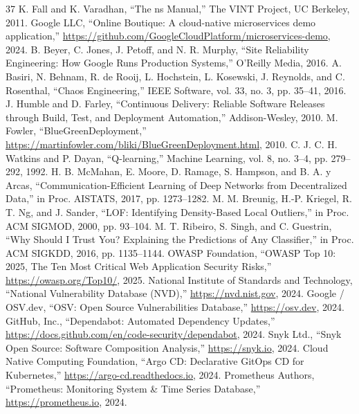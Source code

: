 \documentclass[10pt,conference]{IEEEtran}
\begin{document}
\begin{thebibliography}{37}
 K. Fall and K. Varadhan, ``The ns Manual,'' The VINT Project, UC Berkeley, 2011.
 Google LLC, ``Online Boutique: A cloud-native microservices demo application,'' \url{https://github.com/GoogleCloudPlatform/microservices-demo}, 2024.
 B. Beyer, C. Jones, J. Petoff, and N. R. Murphy, ``Site Reliability Engineering: How Google Runs Production Systems,'' O'Reilly Media, 2016.
 A. Basiri, N. Behnam, R. de Rooij, L. Hochstein, L. Kosewski, J. Reynolds, and C. Rosenthal, ``Chaos Engineering,'' IEEE Software, vol. 33, no. 3, pp. 35--41, 2016.
 J. Humble and D. Farley, ``Continuous Delivery: Reliable Software Releases through Build, Test, and Deployment Automation,'' Addison-Wesley, 2010.
 M. Fowler, ``BlueGreenDeployment,'' \url{https://martinfowler.com/bliki/BlueGreenDeployment.html}, 2010.
 C. J. C. H. Watkins and P. Dayan, ``Q-learning,'' Machine Learning, vol. 8, no. 3--4, pp. 279--292, 1992.
 H. B. McMahan, E. Moore, D. Ramage, S. Hampson, and B. A. y Arcas, ``Communication-Efficient Learning of Deep Networks from Decentralized Data,'' in Proc. AISTATS, 2017, pp. 1273--1282.
 M. M. Breunig, H.-P. Kriegel, R. T. Ng, and J. Sander, ``LOF: Identifying Density-Based Local Outliers,'' in Proc. ACM SIGMOD, 2000, pp. 93--104.
 M. T. Ribeiro, S. Singh, and C. Guestrin, ``Why Should I Trust You? Explaining the Predictions of Any Classifier,'' in Proc. ACM SIGKDD, 2016, pp. 1135--1144.
 OWASP Foundation, ``OWASP Top 10: 2025, The Ten Most Critical Web Application Security Risks,'' \url{https://owasp.org/Top10/}, 2025.
 National Institute of Standards and Technology, ``National Vulnerability Database (NVD),'' \url{https://nvd.nist.gov}, 2024.
 Google / OSV.dev, ``OSV: Open Source Vulnerabilities Database,'' \url{https://osv.dev}, 2024.
 GitHub, Inc., ``Dependabot: Automated Dependency Updates,'' \url{https://docs.github.com/en/code-security/dependabot}, 2024.
 Snyk Ltd., ``Snyk Open Source: Software Composition Analysis,'' \url{https://snyk.io}, 2024.
 Cloud Native Computing Foundation, ``Argo CD: Declarative GitOps CD for Kubernetes,'' \url{https://argo-cd.readthedocs.io}, 2024.
 Prometheus Authors, ``Prometheus: Monitoring System \& Time Series Database,'' \url{https://prometheus.io}, 2024.

\end{thebibliography}
\end{document}
